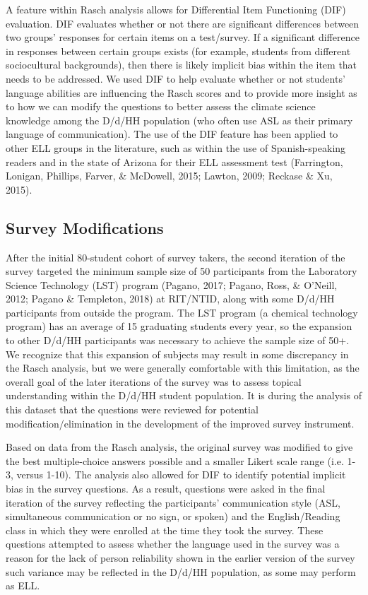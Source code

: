 \documentclass[11.5pt]{sig-alternate} %
\begin{document}
\begin{large}
A feature within Rasch analysis allows for Differential Item Functioning (DIF) evaluation. DIF evaluates whether or not there are significant differences between two groups’ responses for certain items on a test/survey. If a significant difference in responses between certain groups exists (for example, students from different sociocultural backgrounds), then there is likely implicit bias within the item that needs to be addressed. We used DIF to help evaluate whether or not students’ language abilities are influencing the Rasch scores and to provide more insight as to how we can modify the questions to better assess the climate science knowledge among the D/d/HH population (who often use ASL as their primary language of communication). The use of the DIF feature has been applied to other ELL groups in the literature, such as within the use of Spanish-speaking readers and in the state of Arizona for their ELL assessment test (Farrington, Lonigan, Phillips, Farver, \& McDowell, 2015; Lawton, 2009; Reckase \& Xu, 2015).

\subsection*{Survey Modifications}

After the initial 80-student cohort of survey takers, the second iteration of the survey targeted the minimum sample size of 50 participants from the Laboratory Science Technology (LST) program (Pagano, 2017; Pagano, Ross, \& O’Neill, 2012; Pagano \& Templeton, 2018) at RIT/NTID, along with some D/d/HH participants from outside the program. The LST program (a chemical technology program) has an average of 15 graduating students every year, so the expansion to other D/d/HH participants was necessary to achieve the sample size of 50+. We recognize that this expansion of subjects may result in some discrepancy in the Rasch analysis, but we were generally comfortable with this limitation, as the overall goal of the later iterations of the survey was to assess topical understanding within the D/d/HH student population.  It is during the analysis of this dataset that the questions were reviewed for potential modification/elimination in the development of the improved survey instrument.

Based on data from the Rasch analysis, the original survey was modified to give the best multiple-choice answers possible and a smaller Likert scale range (i.e. 1-3, versus 1-10).  The analysis also allowed for DIF to identify potential implicit bias in the survey questions. As a result, questions were asked in the final iteration of the survey reflecting the participants’ communication style (ASL, simultaneous communication or no sign, or spoken) and the English/Reading class in which they were enrolled at the time they took the survey. These questions attempted to assess whether the language used in the survey was a reason for the lack of person reliability shown in the earlier version of the survey such variance may be reflected in the D/d/HH population, as some may perform as ELL.


\end{large}
\end{document}
